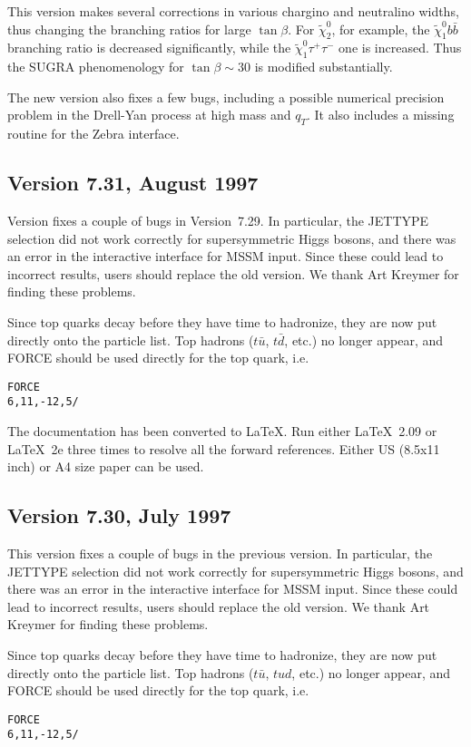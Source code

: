         This version makes several corrections in various chargino and
neutralino widths, thus changing the branching ratios for large
$\tan\beta$. For $\tilde\chi_2^0$, for example, the $\tilde\chi_1^0
b\bar b$ branching ratio is decreased significantly, while the
$\tilde\chi_1^0 \tau^+ \tau^-$ one is increased. Thus the SUGRA
phenomenology for $\tan\beta \sim 30$ is modified substantially.

        The new version also fixes a few bugs, including a possible
numerical precision problem in the Drell-Yan process at high mass and
$q_T$. It also includes a missing routine for the Zebra interface.

\subsection{Version 7.31, August 1997}

        Version fixes a couple of bugs in Version~7.29. In
particular, the JETTYPE selection did not work correctly for
supersymmetric Higgs bosons, and there was an error in the interactive
interface for MSSM input. Since these could lead to incorrect results,
users should replace the old version. We thank Art Kreymer for finding
these problems. 

        Since top quarks decay before they have time to hadronize,
they are now put directly onto the particle list. Top hadrons ($t\bar
u$, $t\bar d$, etc.) no longer appear, and FORCE should be used
directly for the top quark, i.e.
\begin{verbatim}
FORCE
6,11,-12,5/
\end{verbatim}

        The documentation has been converted to LaTeX. Run either
LaTeX~2.09 or LaTeX~2e three times to resolve all the forward
references. Either US (8.5x11 inch) or A4 size paper can be used.

\subsection{Version 7.30, July 1997}

        This version fixes a couple of bugs in the previous version.
In particular, the JETTYPE selection did not work correctly for
supersymmetric Higgs bosons, and there was an error in the interactive
interface for MSSM input. Since these could lead to incorrect results,
users should replace the old version. We thank Art Kreymer for finding
these problems. 

        Since top quarks decay before they have time to hadronize,
they are now put directly onto the particle list. Top hadrons ($t\bar
u$, $tud$, etc.) no longer appear, and FORCE should be used directly
for the top quark, i.e.
\begin{verbatim}
FORCE
6,11,-12,5/
\end{verbatim}

